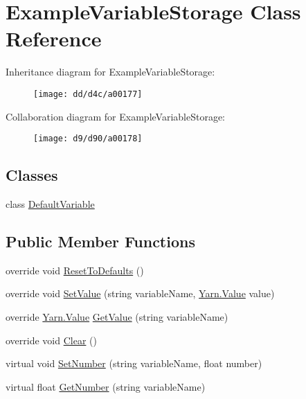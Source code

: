 \hypertarget{a00033}{\section{Example\-Variable\-Storage Class Reference}
\label{a00033}
}


Inheritance diagram for Example\-Variable\-Storage\-:
\nopagebreak
\begin{figure}[H]
\begin{center}
\leavevmode
\texttt{[image: dd/d4c/a00177]}
\end{center}
\end{figure}


Collaboration diagram for Example\-Variable\-Storage\-:
\nopagebreak
\begin{figure}[H]
\begin{center}
\leavevmode
\texttt{[image: d9/d90/a00178]}
\end{center}
\end{figure}
\subsection*{Classes}
\begin{DoxyCompactItemize}
\item 
class \hyperlink{a00033_de/d38/a00160}{Default\-Variable}
\end{DoxyCompactItemize}
\subsection*{Public Member Functions}
\begin{DoxyCompactItemize}
\item 
override void \hyperlink{a00033_a3a05d66cdacadb2e9b618cd0aef45f84}{Reset\-To\-Defaults} ()
\item 
override void \hyperlink{a00033_ac4265c1c9da485f13a6b05784b0f668d}{Set\-Value} (string variable\-Name, \hyperlink{a00086}{Yarn.\-Value} value)
\item 
override \hyperlink{a00086}{Yarn.\-Value} \hyperlink{a00033_a741593be1a299dcc2136f05b9b4a995a}{Get\-Value} (string variable\-Name)
\item 
override void \hyperlink{a00033_a0ce614bee8d5b220500fb765390b4ca3}{Clear} ()
\item 
virtual void \hyperlink{a00089_ac0d2f2e081944ad197992a26ad1a833c}{Set\-Number} (string variable\-Name, float number)
\item 
virtual float \hyperlink{a00089_add85a45dd65a5d4bd41c9d5ce5f77d19}{Get\-Number} (string variable\-Name)
\end{DoxyCompactItemize}
